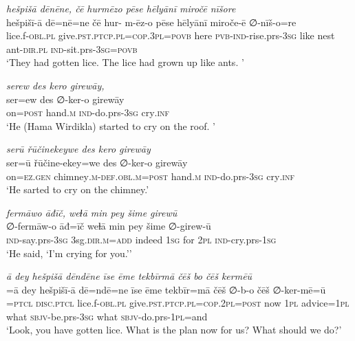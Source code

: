 \ea \label{BP.151}
\textit{hešpišā dēnēne, čē hurmēzo pēse hēlyānī miročē nīšore} \\ 
\gll hešpišī-ā dē=nē=ne čē hur- m-ēz-o pēse hēlyānī miroče-ē ∅-nīš-o=re \\ 
 lice.f\textsc{-obl}\textsc{.pl} give\textsc{.pst}\textsc{.ptcp}\textsc{.pl}\textsc{=cop}\textsc{.3pl}\textsc{=\textsc{povb}} here \textsc{pvb-}\textsc{ind-}rise.prs\textsc{-3sg} like nest ant\textsc{-dir}\textsc{.pl} \textsc{ind-}sit.prs\textsc{-3sg}\textsc{=\textsc{povb}} \\ 
\glt `They had gotten lice. The lice had grown up like ants. '
\z 
 
\ea \label{BP.152}
\textit{serew des kero girewāy,} \\ 
\gll ser=ew des ∅-ker-o girewāy \\ 
 on\textsc{=\textsc{post}} hand\textsc{.m} \textsc{ind-}do.prs\textsc{-3sg} cry\textsc{.inf} \\ 
\glt `He (Hama Wirdikla) started to cry on the roof. '
\z 
 
\ea \label{BP.153}
\textit{serū řūčinekeywe des kero girewāy} \\ 
\gll ser=ū řūčine-ekey=we des ∅-ker-o girewāy \\ 
 on\textsc{=ez.gen} chimney\textsc{.m}\textsc{-def}\textsc{.obl}\textsc{.m}\textsc{=\textsc{post}} hand\textsc{.m} \textsc{ind-}do.prs\textsc{-3sg} cry\textsc{.inf} \\ 
\glt `He sarted to cry on the chimney.'
\z 
 
\ea \label{BP.155}
\textit{fermāwo āđīč, weɫā min pey šime girewū} \\ 
\gll ∅-fermāw-o āđ=īč weɫā min pey šime ∅-girew-ū \\ 
 \textsc{ind-}say.prs\textsc{-3sg} 3sg\textsc{.dir}\textsc{.m}\textsc{=add} indeed \textsc{1sg} for \textsc{2pl} \textsc{ind-}cry.prs\textsc{-\textsc{1sg}} \\ 
\glt `He said, ‘I’m crying for you.’'
\z 
 
\ea \label{BP.156}
\textit{ā dey hešpišā dēndēne īse ēme tekbīrmā čēš bo čēš kermēū} \\ 
\gll =ā dey hešpišī-ā dē=ndē=ne īse ēme tekbīr=mā čēš ∅-b-o čēš ∅-ker-mē=ū \\ 
=\textsc{ptcl} \textsc{disc.ptcl} lice.f\textsc{-obl}\textsc{.pl} give\textsc{.pst}\textsc{.ptcp}\textsc{.pl}\textsc{=cop}.\textsc{2pl}\textsc{=\textsc{post}} now \textsc{1pl} advice\textsc{=\textsc{1pl}} what \textsc{sbjv-}be.prs\textsc{-3sg} what \textsc{sbjv-}do.prs\textsc{-\textsc{1pl}}=and \\ 
\glt `Look, you have gotten lice. What is the plan now for us? What should we do?'
\z 
 
